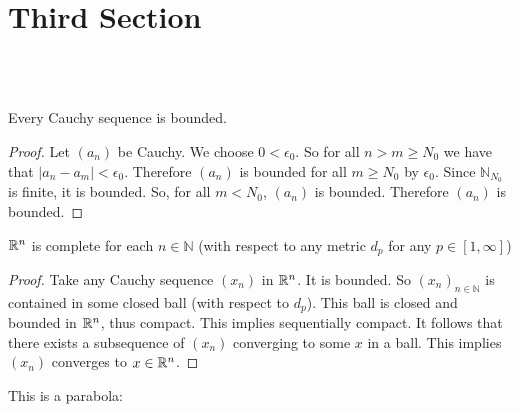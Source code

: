 \documentclass[10pt]{article}
\begin{document}
\section*{Third Section} 
\\\\
\begin{lemma}
    Every Cauchy sequence is bounded.
\end{lemma}
\begin{proof}
    Let $(a_{n})$ be Cauchy. We choose $ 0<\epsilon_{0}$. So for all $ n>m\geq N_{0}$ we have that $\vert a_{n}-a_{m} \vert < \epsilon_{0}$. Therefore $(a_{n})$ is bounded for all $ m \geq N_{0} $ by $ \epsilon_{0} $. Since $ \mathbb{N}_{N_{0}}$ is finite, it is bounded. So, for all $ m<N_{0} $, $ (a_{n})$ is bounded. Therefore $(a_{n})$ is bounded.
\end{proof}
\begin{theorem}
    $\mathbb{R}^n$ is complete for each $n\in \mathbb{N}$ (with respect to any metric $d_p$ for any $p\in[1,\infty]$)
\end{theorem}
\begin{proof}
    Take any Cauchy sequence $(x_n)$ in $\mathbb{R}^n$. It is bounded. So $(x_n)_{n\in \mathbb{N}}$ is contained in some closed ball (with respect to $d_p$). This ball is closed and bounded in $\mathbb{R}^n$, thus compact. This implies sequentially compact. It follows that there exists a subsequence of $(x_n)$ converging to some $x$ in a ball. This implies $(x_n)$ converges to $x\in\mathbb{R}^n$.
\end{proof}
\begin{proposition}
    This is a parabola:
    \begin{center}
    \end{center}
\end{proposition}
\end{document}
